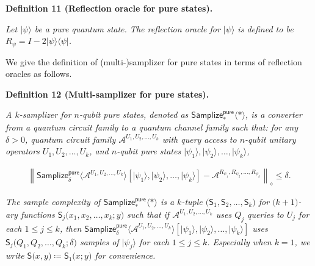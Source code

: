 

\par\medskip\noindent\textbf{
\textbf{Definition 11}\textbf{ }(Reflection oracle for pure states)\textbf{.}
}\par



\emph{Let $\lvert\psi\rangle$ be a pure quantum state.
The reflection oracle for $\lvert\psi\rangle$ is defined to be $R_{\psi}=I-2\lvert\psi\rangle\!\langle\psi\rvert$.}\par






We give the definition of (multi-)samplizer for pure states in terms of reflection oracles as follows.\par





\par\medskip\noindent\textbf{
\textbf{Definition 12}\textbf{ }(Multi-samplizer for pure states)\textbf{.}
}\par



\emph{A $k$-samplizer for $n$-qubit pure states, denoted as $\mathsf{Samplize}^{\mathsf{pure}}_{*}\langle*\rangle$, is a converter from a quantum circuit family to a quantum channel family such that:
for any $\delta>0$, quantum circuit family $\mathcal{A}^{U_{1},U_{2},\dots,U_{k}}$ with query access to $n$-qubit unitary operators $U_{1},U_{2},\dots,U_{k}$, and $n$-qubit pure states $\lvert\psi_{1}\rangle,\lvert\psi_{2}\rangle,\dots,\lvert\psi_{k}\rangle$,}\par


\[\begin{gathered}
\left\lVert\mathsf{Samplize}^{\mathsf{pure}}_{\delta}\langle\mathcal{A}^{U_{1},U_{2},\dots,U_{k}}\rangle[\lvert\psi_{1}\rangle,\lvert\psi_{2}\rangle,\dots,\lvert\psi_{k}\rangle]-\mathcal{A}^{R_{\psi_{1}},R_{\psi_{2}},\dots,R_{\psi_{k}}}\right\rVert_{\diamond}\leq\delta.
\end{gathered}\]




\emph{The sample complexity of $\mathsf{Samplize}^{\mathsf{pure}}_{*}\langle*\rangle$ is a $k$-tuple $\lparen\mathsf{S}_{1},\mathsf{S}_{2},\dots,\mathsf{S}_{k}\rparen$ for $\lparen k+1\rparen$-ary functions $\mathsf{S}_{j}\lparen x_{1},x_{2},\dots,x_{k};y\rparen$ such that if $\mathcal{A}^{U_{1},U_{2},\dots,U_{k}}$ uses $Q_{j}$ queries to $U_{j}$ for each $1\leq j\leq k$, then $\mathsf{Samplize}^{\mathsf{pure}}_{\delta}\langle\mathcal{A}^{U_{1},U_{2},\dots,U_{k}}\rangle[\lvert\psi_{1}\rangle,\lvert\psi_{2}\rangle,\dots,\lvert\psi_{k}\rangle]$ uses $\mathsf{S}_{j}\lparen Q_{1},Q_{2},\dots,Q_{k};\delta\rparen$ samples of $\lvert\psi_{j}\rangle$ for each $1\leq j\leq k$.
Especially when $k=1$, we write $\mathsf{S}\lparen x,y\rparen\coloneqq\mathsf{S}_{1}\lparen x;y\rparen$ for convenience.}\par




